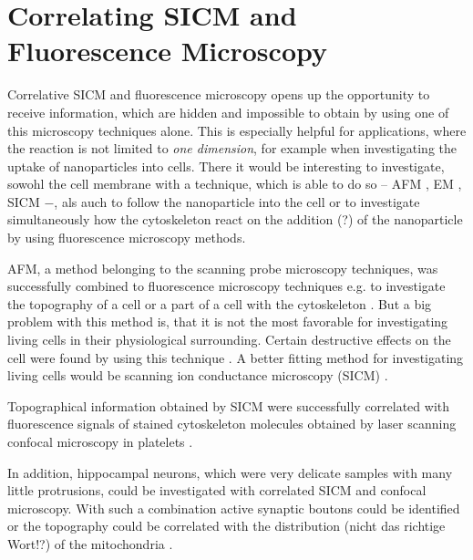 \section{Correlating SICM and Fluorescence Microscopy}
\label{sec:correlating-sicm-and-fm}
Correlative SICM and fluorescence microscopy opens up the opportunity to receive information, 
which are hidden and impossible to obtain by using one of this microscopy techniques alone. 
This is especially helpful for applications, where the reaction is not limited to \emph{one 
dimension}, for example when investigating the uptake of nanoparticles into cells. There it would 
be interesting to investigate, sowohl %
the cell membrane with a technique, which is able to do so $–$ AFM \cite{}, EM \cite{}, SICM 
\cite{Hansma1989} $-$, als auch %
to follow the nanoparticle into the cell or to investigate simultaneously how the cytoskeleton 
react on the addition (?) of the nanoparticle by using fluorescence microscopy methods.

AFM, a method belonging to the scanning probe microscopy techniques, was successfully
combined to fluorescence microscopy techniques e.g. to investigate the topography of a 
cell or a part of a cell with the cytoskeleton \cite{Laishram2009,Liu2020}. But a big problem 
with this method is, that it is not the most favorable for investigating living cells in their
physiological surrounding. Certain destructive effects on the cell were found by using this 
technique \cite{}. A better fitting method for investigating living cells would be scanning 
ion conductance microscopy (SICM) \cite{Hansma1989}. 


Topographical information obtained by SICM were successfully correlated with fluorescence signals
of stained cytoskeleton molecules obtained by laser scanning confocal microscopy in platelets 
\cite{Seifert2017}. 

In addition, hippocampal neurons, which were very delicate samples with many little protrusions, 
could be investigated with correlated SICM and confocal microscopy. With such a combination active
synaptic boutons could be identified \cite{Novak2013} or the topography could be correlated with 
the distribution (nicht das richtige Wort!?) of the mitochondria \cite{Takahashi2020}. 

